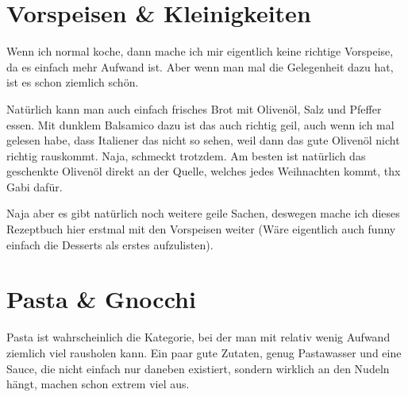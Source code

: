 \documentclass[
  a4paper,
  twoside,
  11pt
]{article}
\begin{document}









\section{Vorspeisen \& Kleinigkeiten}

Wenn ich normal koche, dann mache ich mir eigentlich keine richtige Vorspeise, da es einfach mehr Aufwand ist. Aber wenn man mal die Gelegenheit dazu hat, ist es schon ziemlich schön.

Natürlich kann man auch einfach frisches Brot mit Olivenöl, Salz und Pfeffer essen. Mit dunklem Balsamico dazu ist das auch richtig geil, auch wenn ich mal gelesen habe, dass Italiener das nicht so sehen, weil dann das gute Olivenöl nicht richtig rauskommt. Naja, schmeckt trotzdem. Am besten ist natürlich das geschenkte Olivenöl direkt an der Quelle, welches jedes Weihnachten kommt, thx Gabi dafür.

Naja aber es gibt natürlich noch weitere geile Sachen, deswegen mache ich dieses Rezeptbuch hier erstmal mit den Vorspeisen weiter (Wäre eigentlich auch funny einfach die Desserts als erstes aufzulisten).


\mylocaltableofcontents%
\newpage









\section{Pasta \& Gnocchi}

Pasta ist wahrscheinlich die Kategorie, bei der man mit relativ wenig Aufwand ziemlich viel rausholen kann. Ein paar gute Zutaten, genug Pastawasser und eine Sauce, die nicht einfach nur daneben existiert, sondern wirklich an den Nudeln hängt, machen schon extrem viel aus.
\end{document}
